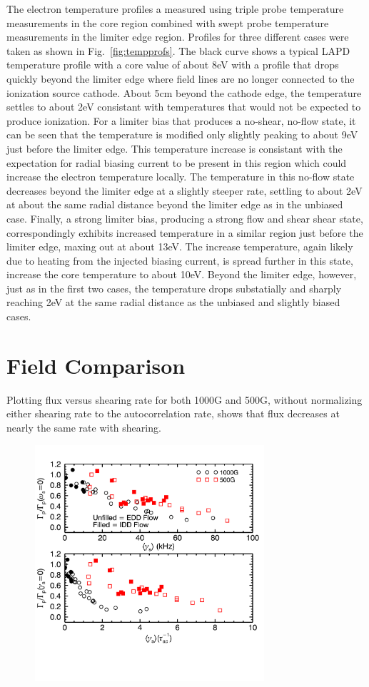 \documentclass[aip,pop,amsmath,amssymb,preprint,superscriptaddress]{revtex4-1} %
\begin{document}
The electron temperature profiles a measured using triple probe temperature measurements in the core region combined with swept probe temperature measurements in the limiter edge region. Profiles for three different cases were taken as shown in Fig.~\ref{fig:tempprofs}. The black curve shows a typical LAPD temperature profile with a core value of about 8eV with a profile that drops quickly beyond the limiter edge where field lines are no longer connected to the ionization source cathode. About 5cm beyond the cathode edge, the temperature settles to about 2eV consistant with temperatures that would not be expected to produce ionization. For a limiter bias that produces a no-shear, no-flow state, it can be seen that the temperature is modified only slightly peaking to about 9eV just before the limiter edge. This temperature increase is consistant with the expectation for radial biasing current to be present in this region which could increase the electron temperature locally. The temperature in this no-flow state decreases beyond the limiter edge at a slightly steeper rate, settling to about 2eV at about the same radial distance beyond the limiter edge as in the unbiased case. Finally, a strong limiter bias, producing a strong flow and shear shear state, correspondingly exhibits increased temperature in a similar region just before the limiter edge, maxing out at about 13eV. The increase temperature, again likely due to heating from the injected biasing current, is spread further in this state, increase the core temperature to about 10eV. Beyond the limiter edge, however, just as in the first two cases, the temperature drops substatially and sharply reaching 2eV at the same radial distance as the unbiased and slightly biased cases.

\section{Field Comparison}

Plotting flux versus shearing rate for both 1000G and 500G, without normalizing either shearing rate to the autocorrelation rate, shows that flux decreases at nearly the same rate with shearing.

\begin{figure}[!htbp]
\centerline{
\includegraphics[width=8.5cm]{flux1000Gvs500G.png}}
\caption{\label{fig:fluxcomps}}
\end{figure}
\end{document}
